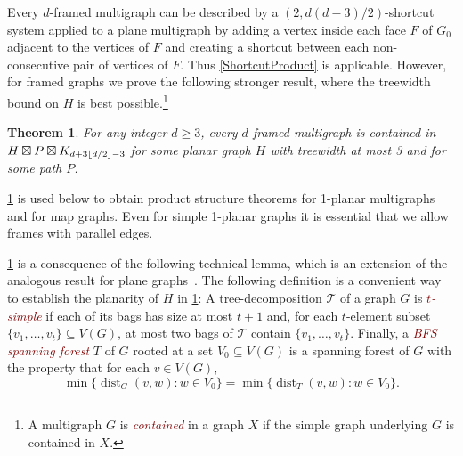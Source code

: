 \documentclass{patmorin}
\theoremstyle{plain}
\newtheorem{thm}{Theorem}
\theoremstyle{definition}
\newcommand{\defin}[1]{\textcolor{Maroon}{\emph{#1}}}
\newcommand{\note}[2]{\noindent{\color{red}[#1:~#2]}}
\DeclareMathOperator{\dist}{dist}
\DeclarePairedDelimiter{\floor}{\lfloor}{\rfloor}
\renewcommand{\ge}{\geqslant}
\begin{document}
Every $d$-framed multigraph can be described by a $(2,d(d-3)/2)$-shortcut system applied to a plane multigraph by adding a vertex inside each face $F$ of $G_0$ adjacent to the vertices of $F$ and creating a shortcut between each non-consecutive pair of vertices of $F$. Thus \cref{ShortcutProduct} is applicable. However, for framed graphs we prove the following stronger result, where the treewidth bound on $H$ is best possible.\footnote{A multigraph $G$ is \defin{contained} in a graph $X$ if the simple graph underlying $G$ is contained in $X$.}

\begin{thm}\label{d_framed_product_stucture}
For any integer $d\ge 3$, every $d$-framed multigraph is contained in $H\boxtimes P\boxtimes K_{d+3\floor{d/2}-3}$ for some planar graph $H$ with treewidth at most 3 and for some path $P$.
\end{thm}

\cref{d_framed_product_stucture} is used below to obtain product structure theorems for 1-planar multigraphs and for map graphs.  Even for simple 1-planar graphs it is essential that we allow frames with parallel edges.

\cref{d_framed_product_stucture} is a consequence of the following technical lemma, which is an extension of the analogous result for plane graphs~\cite{DJMMUW20}. The following definition is a convenient way to establish the planarity of $H$ in \cref{d_framed_product_stucture}:  A tree-decomposition $\mathcal{T}$ of a graph $G$ is \defin{$t$-simple} if each of its bags has size at most $t+1$ and, for each $t$-element subset $\{v_1,\ldots,v_t\}\subseteq V(G)$, at most two bags of $\mathcal{T}$ contain $\{v_1,\ldots,v_t\}$.  Finally, a \defin{BFS spanning forest} $T$ of $G$ rooted at a set $V_0\subseteq V(G)$ is a spanning forest of $G$ with the property that for each $v\in V(G)$,  \[\min\{\dist_G(v,w):w\in V_0\}=\min\{\dist_T(v,w):w\in V_0\}.\]

%
%
\end{document}

